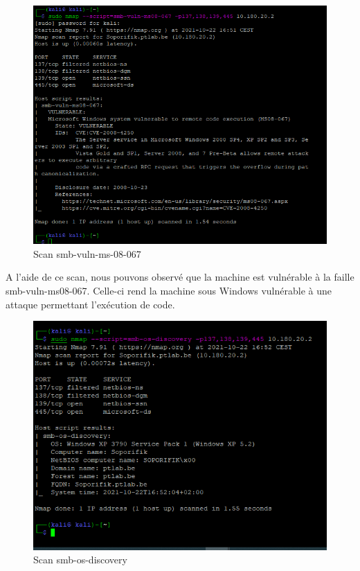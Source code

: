 \documentclass[french,paper=a4,oneside,captions=tableheading]{article}
\begin{document}
\begin{figure}[H]
    \centering
    \includegraphics[width=15cm]{images/Secu_Offensive_20.png}
    \caption{Scan smb-vuln-ms-08-067}
    \label{fig:smb1}
\end{figure}

A l'aide de ce scan, nous pouvons observé que la machine est vulnérable à la faille smb-vuln-ms08-067. Celle-ci rend la machine sous Windows vulnérable à une attaque permettant l'exécution de code.

\begin{figure}[H]
    \centering
    \includegraphics[width=13cm]{images/Secu_Offensive_21.png}
    \caption{Scan smb-os-discovery}
    \label{fig:smb2}
\end{figure}
\end{document}
